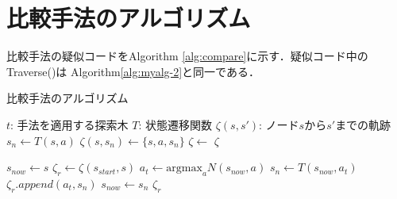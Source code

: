 \section{比較手法のアルゴリズム}
比較手法の疑似コードをAlgorithm \ref{alg:compare}に示す．疑似コード中のTraverse()は Algorithm\ref{alg:myalg-2}と同一である．
\begin{algorithm}
    \caption{比較手法のアルゴリズム}
    \label{alg:compare}
    \begin{algorithmic}[1]       
        \State $t$: 手法を適用する探索木
        \State $T$: 状態遷移関数
        \State $\zeta(s, s')$: ノード$s$から$s'$までの軌跡
           \State $s_n \gets T(s, a)$
           \State $\zeta(s, s_n) \gets \{s, a, s_n\}$
           \State $\zeta \gets$ 
           \Return $\zeta$
        \EndFunction
        
            \State $s_{now} \gets s$
            \State $\zeta_r \gets \zeta(s_{start}, s)$
                \State $a_t \gets \textrm{argmax}_a N(s_{now}, a)$
                \State $s_n \gets T(s_{now}, a_t)$
                \State $\zeta_r.append({a_t, s_n})$
                \State $s_{now} \gets s_n$
            \EndWhile
            \Return $\zeta_r$
        \EndFunction
       
        
    \end{algorithmic}
\end{algorithm}


